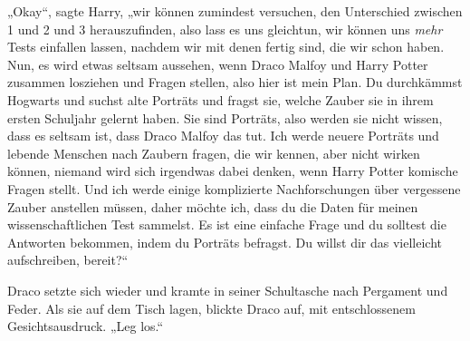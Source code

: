 „Okay“, sagte Harry, „wir können zumindest versuchen, den Unterschied zwischen 1 und 2 und 3 herauszufinden, also lass es uns gleichtun, wir können uns \emph{mehr} Tests einfallen lassen, nachdem wir mit denen fertig sind, die wir schon haben. Nun, es wird etwas seltsam aussehen, wenn Draco Malfoy und Harry Potter zusammen losziehen und Fragen stellen, also hier ist mein Plan. Du durchkämmst Hogwarts und suchst alte Porträts und fragst sie, welche Zauber sie in ihrem ersten Schuljahr gelernt haben. Sie sind Porträts, also werden sie nicht wissen, dass es seltsam ist, dass Draco Malfoy das tut. Ich werde neuere Porträts und lebende Menschen nach Zaubern fragen, die wir kennen, aber nicht wirken können, niemand wird sich irgendwas dabei denken, wenn Harry Potter komische Fragen stellt. Und ich werde einige komplizierte Nachforschungen über vergessene Zauber anstellen müssen, daher möchte ich, dass du die Daten für meinen wissenschaftlichen Test sammelst. Es ist eine einfache Frage und du solltest die Antworten bekommen, indem du Porträts befragst. Du willst dir das vielleicht aufschreiben, bereit?“

Draco setzte sich wieder und kramte in seiner Schultasche nach Pergament und Feder. Als sie auf dem Tisch lagen, blickte Draco auf, mit entschlossenem Gesichtsausdruck.
„Leg los.“

